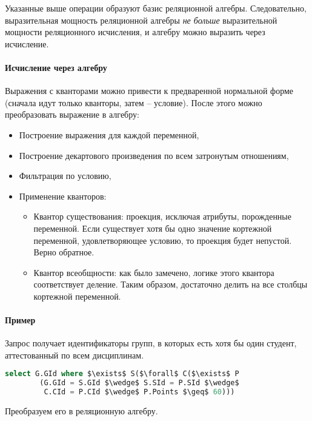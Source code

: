 Указанные выше операции образуют базис реляционной алгебры. Следовательно, выразительная мощность
реляционной алгебры \textit{не больше} выразительной мощности реляционного исчисления, и
алгебру можно выразить через исчисление.

\paragraph{Исчисление через алгебру}

Выражения с кванторами можно привести к предваренной нормальной форме (сначала идут только
кванторы, затем -- условие). После этого можно преобразовать выражение в алгебру:

\begin{itemize}
	\item Построение выражения для каждой переменной,
	\item Построение декартового произведения по всем затронутым отношениям,
	\item Фильтрация по условию,
	\item Применение кванторов:
	      \begin{itemize}
		      \item Квантор существования: проекция, исключая атрибуты, порожденные переменной. Если существует хотя бы
		            одно значение кортежной переменной, удовлетворяющее условию, то проекция будет непустой. Верно
		            обратное.
		      \item Квантор всеобщности: как было замечено, логике этого квантора соответствует деление. Таким образом,
		            достаточно делить на все столбцы кортежной переменной.
	      \end{itemize}
\end{itemize}

\paragraph{Пример}

Запрос получает идентификаторы групп, в которых есть хотя бы один студент, аттестованный по всем
дисциплинам.

\begin{lstlisting}[language=SQL, mathescape=true]
    select G.GId where $\exists$ S($\forall$ C($\exists$ P
        (G.GId = S.GId $\wedge$ S.SId = P.SId $\wedge$
         C.CId = P.CId $\wedge$ P.Points $\geq$ 60)))
\end{lstlisting}

Преобразуем его в реляционную алгебру.

